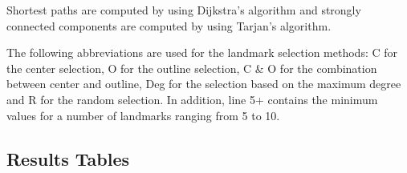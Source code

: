 Shortest paths are computed by using Dijkstra's algorithm and strongly connected components are computed by using Tarjan's algorithm.

The following abbreviations are used for the landmark selection methods: C for the center selection, O for the outline selection, C \& O for the combination between center and outline, Deg for the selection based on the maximum degree and R for the random selection. In addition, line 5+ contains the minimum values for a number of landmarks ranging from 5 to 10.

\pagebreak

\subsection{Results Tables}

\begin{table}[h!]
    \centering
\end{table}
